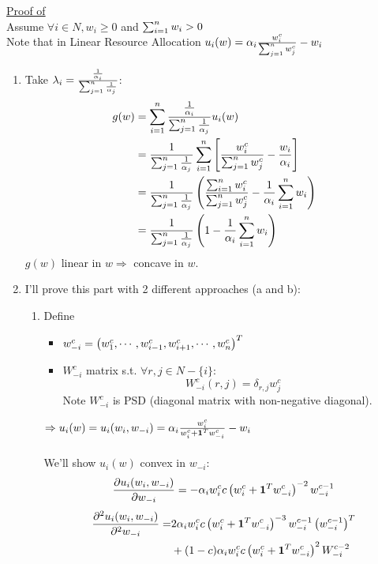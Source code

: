 \documentclass[11pt]{article}
\theoremstyle{definition}
\theoremstyle{definition}
\begin{document}
\def\sj{\sum_{j=1}^n}
\def\sai{\sj \fracc{\alpha_j}}
\def\wic{w_i^c}
\def\wmic{w_{-i}^c}
\def\lwmic{\textbf{1}^T\wmic}
\def\fai{\frac{\fracc{\ai}}{\sai}}





\underline{Proof of }\\
Assume $\forall i \in N, w_i \geq 0$ and $\sum_{i=1}^n w_i > 0$\\
Note that in Linear Resource Allocation $u_i(w) = \ai \frac{\wic}{\sj w_j^c} - w_i$
\begin{enumerate}
	\item
		Take $\li = \fai$:
		\begin{align*}
			g(w) & = \si \frac{\fracc{\ai}}{\sum_{j=1}^n \fracc{\alpha_j}} u_i(w)\\
			     & = \fracc{\sai} \si \mpr{\frac{\wic}{\sj w_j^c} - \frac{w_i}{\ai}}\\
			     & = \fracc{\sai} \pr{\frac{\si w_i^c}{\sj w_j^c} - \fracc{\ai} \si w_i}\\
			     & = \fracc{\sai} \pr{1 - \fracc{\ai} \si w_i}
		\end{align*}
		$g(w)$ linear in $w \Rightarrow$ concave in $w$.

	\item
		I'll prove this part with 2 different approaches (a and b):
		\begin{enumerate}
			\item
			Define
			\begin{itemize}
				\item
					$\wmic = \pr{w_1^c,\cdots,w_{i-1}^c,w_{i+1}^c,\cdots,w_n^c}^T$
				\item
					$W_{-i}^c$ matrix s.t. $\forall r,j \in N-\{i\}$:
					$$W_{-i}^c(r,j) = \delta_{r,j} w_j^c$$
					Note $W_{-i}^c$ is PSD (diagonal matrix with non-negative diagonal).
			\end{itemize}
			$\Rightarrow u_i(w) = u_i(w_i,w_{-i}) = \ai \frac{\wic}{\wic + \lwmic} - w_i$\\\\
			We'll show $u_i(w)$ convex in $w_{-i}$:\\
			$$\frac{\partial u_i(w_i,w_{-i})}{\partial w_{-i}} = -\ai\wic c \pr{\wic + \lwmic}^{-2} w_{-i}^{c-1}$$
			\begin{align*}
				\frac{\partial^2 u_i(w_i, w_{-i})}{\partial^2 w_{-i}} = & 2\ai \wic c \pr{\wic + \lwmic}^{-3} w_{-i}^{c-1} \pr{w_{-i}^{c-1}}^T\\
											& + (1-c)\ai \wic c \pr{\wic + \lwmic}^2 W_{-i}^{c-2}
			\end{align*}


\end{enumerate}
\end{enumerate}
\end{document}
